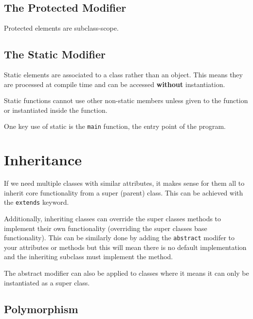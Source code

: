 \documentclass[a4paper, 12pt, twoside]{article}
\begin{document}
\subsection{The Protected Modifier}

Protected elements are subclass-scope.

\subsection{The Static Modifier}

Static elements are associated to a class rather than an object.
This means they are processed at compile time and can be accessed
\textbf{without} instantiation.

\vspace{\baselineskip}

Static functions cannot use other non-static members unless given
to the function or instantiated inside the function.

\vspace{\baselineskip}

One key use of static is the \texttt{main} function, the entry point
of the program.

\section{Inheritance}

If we need multiple classes with similar attributes, it makes sense
for them all to inherit core functionality from a super (parent) class.
This can be achieved with the \texttt{extends} keyword.

\vspace{\baselineskip}

Additionally, inheriting classes can override the super classes methods
to implement their own functionality (overriding the super classes
base functionality). This can be similarly done by adding the
\texttt{abstract} modifer to your attributes or methods but this will
mean there is no default implementation and the inheriting subclass
must implement the method.

\vspace{\baselineskip}

The abstract modifier can also be applied to classes where it means
it can only be instantiated as a super class.

\subsection{Polymorphism}
\end{document}
